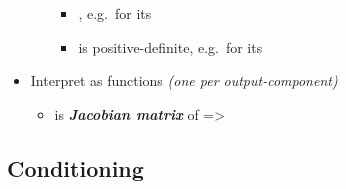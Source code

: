 \begin{itemize}
\begin{itemize}
                \begin{itemize}

                  \item
                        , e.g.~for 
                        its 
                  \item
                         is positive-definite, e.g.~for
                         its 
                \end{itemize}
        \end{itemize}
  \item
        Interpret  as 
        functions  \emph{(one
          per output-component)}

        \begin{itemize}

          \item
                is \textbf{\emph{Jacobian matrix}} of  =\textgreater{}
        \end{itemize}
\end{itemize}

\subsection*{Conditioning}

